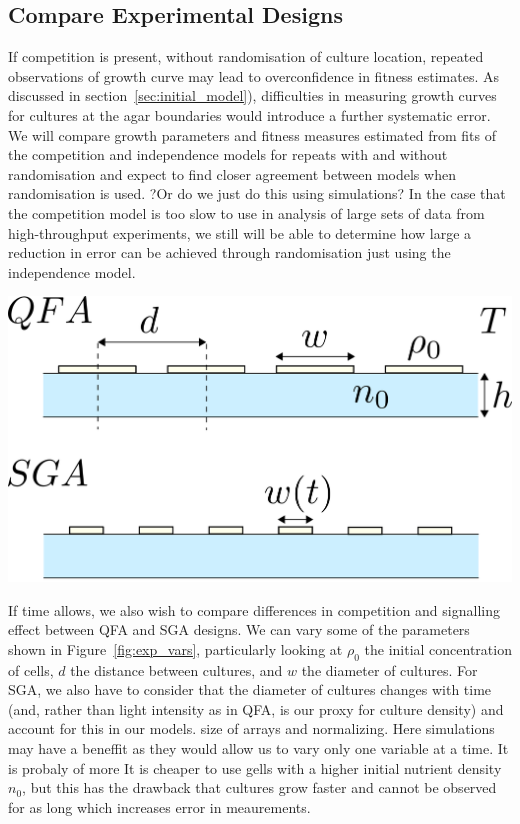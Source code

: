 \subsection{Compare Experimental Designs}
\label{sec:comp-exper-designs}

If competition is present, without randomisation of culture location,
repeated observations of growth curve may lead to overconfidence in
fitness estimates. As discussed in section~\ref{sec:initial_model}),
difficulties in measuring growth curves for cultures at the agar
boundaries would introduce a further systematic error. We will compare
growth parameters and fitness measures estimated from fits of the
competition and independence models for repeats with and without
randomisation and expect to find closer agreement between models when
randomisation is used. ?Or do we just do this using simulations? In
the case that the competition model is too slow to use in analysis of
large sets of data from high-throughput experiments, we still will be
able to determine how large a reduction in error can be achieved
through randomisation just using the independence model.

\begin{Figure}
  \centering
  \includegraphics[width=\linewidth]{qfa_v_sga_vars}
  \label{fig:exp_vars}
\end{Figure}

If time allows, we also wish to compare differences in competition and
signalling effect between QFA and SGA designs. We can vary some of the
parameters shown in Figure~\ref{fig:exp_vars}, particularly looking at
\(\rho_{0}\) the initial concentration of cells, \(d\) the distance
between cultures, and \(w\) the diameter of cultures. For SGA, we also
have to consider that the diameter of cultures changes with time (and,
rather than light intensity as in QFA, is our proxy for culture
density) and account for this in our models. size of arrays and normalizing. Here
simulations may have a beneffit as they would allow us to vary only
one variable at a time. It is probaly of more
It is cheaper to use gells with a higher initial nutrient density
\(n_{0}\), but this has the drawback that cultures grow faster and
cannot be observed for as long which increases error in meaurements.


